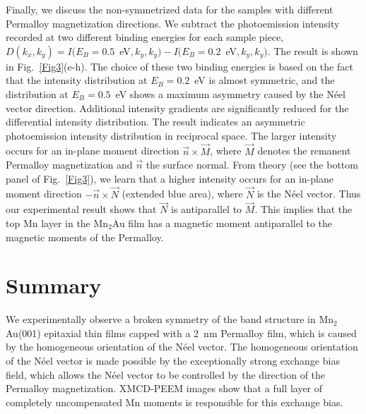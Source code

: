 \documentclass[aps,prb,twocolumn,superscriptaddress,10pt]{revtex4-1}
\begin{document}
Finally, we discuss the non-symmetrized data for the samples with
different Permalloy magnetization directions.
We subtract the photoemission intensity recorded at two different binding energies 
for each sample piece,
$D(k_x,k_y) = I(E_B=0.5$~eV$,k_y,k_y)- I(E_B=0.2$~eV$,k_y,k_y)$.
The result is shown in Fig.~\ref{Fig3}(e-h). 
The choice of these two binding energies is based on the fact that
the intensity distribution at $E_B=0.2$~eV is almost symmetric, 
and the distribution at $E_B=0.5$~eV shows a maximum asymmetry caused by the N{\'e}el vector direction. 
Additional intensity gradients are significantly reduced for the 
differential intensity distribution. 
The result indicates an asymmetric photoemission intensity distribution
in reciprocal space.
The larger intensity occurs for an in-plane moment
direction $\vec{n}\times \vec{M}$, where $\vec{M}$
denotes the remanent Permalloy magnetization and $\vec{n}$ the surface normal. 
From theory (see the bottom panel of Fig.~\ref{Fig3}), we learn that a higher intensity occurs for an in-plane moment
direction $-\vec{n}\times \vec{N}$ (extended blue area), where $\vec{N}$
is the N{\'e}el vector. 
Thus our experimental result shows that  $\vec{N}$ is antiparallel to $\vec{M}$. 
This implies that the top Mn layer in the Mn$_2$Au film has a magnetic moment antiparallel to the magnetic moments of the Permalloy.

\hspace{0.1cm}

\section{Summary}
We experimentally observe a broken symmetry of the band structure in Mn$_2$Au(001) epitaxial thin films capped with a 2~nm Permalloy film, which is caused by the homogeneous orientation of the N{\'e}el vector. 
The homogeneous orientation of the N{\'e}el vector is made possible by the exceptionally strong exchange bias field, which allows the N{\'e}el vector to be controlled by the direction of the Permalloy magnetization. XMCD-PEEM images show that a full
layer of completely uncompensated Mn moments is responsible for this exchange bias.
\end{document}
